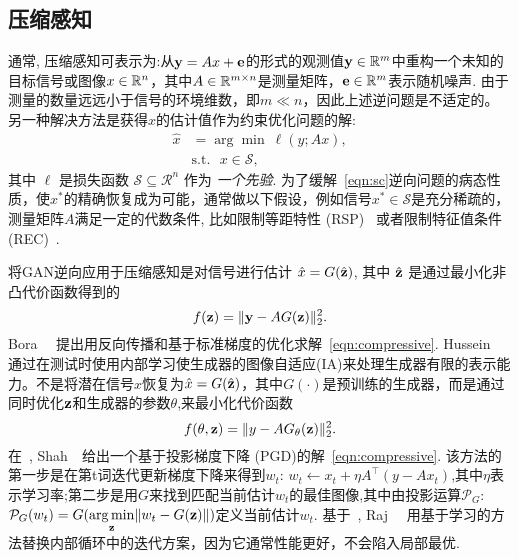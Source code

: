 \algotransfer

\figtransfer

\subsection{压缩感知}
\label{sec:compressing}
通常, 压缩感知可表示为:从$\mathbf{y}={A} x+\mathbf{e}$的形式的观测值$\mathbf{y} \in \mathbb{R}^{m}$中重构一个未知的目标信号或图像$x \in \mathbb{R}^{n}$，其中$A \in \mathbb{R}^{m \times n}$是测量矩阵，$\mathbf{e} \in \mathbb{R}^{m}$表示随机噪声.
由于测量的数量远远小于信号的环境维数，即$m \ll n$，因此上述逆问题是不适定的。另一种解决方法是获得$\hat{x}$的估计值作为约束优化问题的解:
\begin{equation}
\begin{aligned}
\hat{x} &= \arg\min~\ell(y; Ax),\\
&\text{s.t.}~~~x \in \mathcal{S},
\label{eqn:sc}
\end{aligned}   
\end{equation}
其中 $\ell$ 是损失函数 $\mathcal{S} \subseteq \mathcal{R}^n$ 作为 \emph{一个先验}. 
为了缓解~\eqref{eqn:sc}逆向问题的病态性质，使$x^*$的精确恢复成为可能，通常做以下假设，例如信号$x^* \in \mathcal{S}$是充分稀疏的，测量矩阵$A$满足一定的代数条件, 比如限制等距特性 (RSP)~\cite{candes2006compressive} 或者限制特征值条件 (REC)~\cite{donoho2006compressed}.

将GAN逆向应用于压缩感知是对信号进行估计 $\hat{x}=G(\hat{\mathbf{z}})$, 其中 $\hat{\mathbf{z}}$ 是通过最小化非凸代价函数得到的
\begin{equation}
\label{eqn:compressive}
f(\z)=\|\y-AG(\z)\|_{2}^{2}. 
\end{equation}
Bora~\etal~\cite{bora2017compressed} 提出用反向传播和基于标准梯度的优化求解~\eqref{eqn:compressive}.
Hussein~\etal~\cite{hussein2019image} 通过在测试时使用内部学习使生成器的图像自适应(IA)来处理生成器有限的表示能力。不是将潜在信号$x$恢复为$\hat{x}=G(\hat{\mathbf{z}})$，其中$G(\cdot)$是预训练的生成器，而是通过同时优化$\mathbf{z}$和生成器的参数$\theta$,来最小化代价函数
\begin{equation}
f(\theta, \mathbf{z})=\|y-AG_{\theta}(\mathbf{z})\|_{2}^{2}.
\end{equation}
在~\cite{shah2018solving}, Shah~\etal~给出一个基于投影梯度下降 (PGD)的解~\eqref{eqn:compressive}.
该方法的第一步是在第t词迭代更新梯度下降来得到${w_t}$: ${w_t} \leftarrow x_t + \eta A^{\top}(y-Ax_t)$,其中$\eta$表示学习率;第二步是用$G$来找到匹配当前估计${w_t}$的最佳图像,其中由投影运算$\mathcal{P}_G$: $\mathcal{P}_G({w_t}) = G(\underset{\mathbf{z}}{\arg\min}\|{w_t} - G(\mathbf{z})\|)$定义当前估计${w_t}$.
基于~\cite{shah2018solving}, Raj~\etal~\cite{raj2019gan} 用基于学习的方法替换内部循环中的迭代方案，因为它通常性能更好，不会陷入局部最优.


